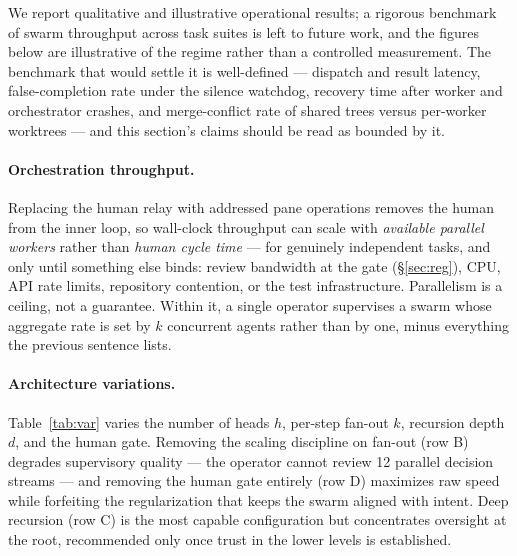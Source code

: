 \documentclass[10pt]{article}
\begin{document}
We report qualitative and illustrative operational results; a rigorous benchmark of
swarm throughput across task suites is left to future work, and the figures below are
illustrative of the regime rather than a controlled measurement. The benchmark that
would settle it is well-defined --- dispatch and result latency, false-completion
rate under the silence watchdog, recovery time after worker and orchestrator
crashes, and merge-conflict rate of shared trees versus per-worker worktrees ---
and this section's claims should be read as bounded by it.

\paragraph{Orchestration throughput.} Replacing the human relay with addressed pane
operations removes the human from the inner loop, so wall-clock throughput can scale
with \emph{available parallel workers} rather than \emph{human cycle time} --- for
genuinely independent tasks, and only until something else binds: review bandwidth
at the gate (\S\ref{sec:reg}), CPU, API rate limits, repository contention, or the
test infrastructure. Parallelism is a ceiling, not a guarantee. Within it, a single
operator supervises a swarm whose aggregate rate is set by $k$ concurrent agents
rather than by one, minus everything the previous sentence lists.

\paragraph{Architecture variations.} Table~\ref{tab:var} varies the number of heads
$h$, per-step fan-out $k$, recursion depth $d$, and the human gate. Removing the
scaling discipline on fan-out (row B) degrades supervisory quality --- the operator
cannot review 12 parallel decision streams --- and removing the human gate entirely
(row D) maximizes raw speed while forfeiting the regularization that keeps the swarm
aligned with intent. Deep recursion (row C) is the most capable configuration but
concentrates oversight at the root, recommended only once trust in the lower levels is
established.
\end{document}
